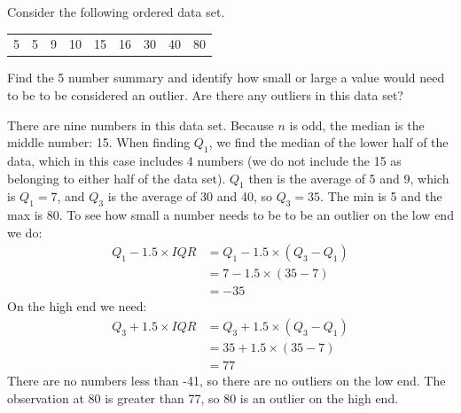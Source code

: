 \begin{examplewrap}
\begin{nexample}
{Consider the following ordered data set.
\begin{center}
\begin{tabular}{ccc ccc ccc}
5 & 5 & 9 & 10 & 15 & 16 & 30 & 40 & 80 
\end{tabular}
\end{center}
Find the 5 number summary and identify how small or large a value would need to be to be considered an outlier.  Are there any outliers in this data set?}
There are nine numbers in this data set.  Because $n$ is odd, the median is the middle number: 15.  When finding $Q_1$, we find the median of the lower half of the data, which in this case includes 4 numbers (we do not include the 15 as belonging to either half of the data set).  $Q_1$ then is the average of 5 and 9, which is $Q_1 = 7$, and $Q_3$ is the average of 30 and 40, so $Q_3 = 35$.  The min is 5 and the max is 80.  To see how small a number needs to be to be an outlier on the low end we do:
\begin{align*}
Q_1 - 1.5 \times IQR
	&= Q_1 - 1.5 \times (Q_3 - Q_1) \\
	& = 7 - 1.5 \times (35 - 7) \\
	& = -35
\end{align*}
On the high end we need:
\begin{align*}
Q_3 + 1.5 \times IQR
	& = Q_3 + 1.5 \times (Q_3-Q_1) \\
	& = 35 + 1.5 \times (35 - 7) \\
	& = 77
\end{align*}
There are no numbers less than -41, so there are no outliers on the low end. The observation at 80 is greater than 77, so 80 is an outlier on the high end.
\end{nexample}
\end{examplewrap}




